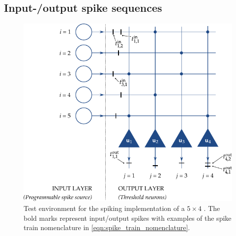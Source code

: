 \subsection{Input-/output spike sequences}
\label{sec:input_output_time_window}

\begin{figure}
	\centering
	\includegraphics{media/chp3/spinam_nomenclature.pdf}
	\caption[Spiking BiNAM implementation and spike train nomenclature]{Test environment for the spiking implementation of a $5 \times 4$ \BiNAM. The bold marks represent input/output spikes with examples of the spike train nomenclature in \cref{eqn:spike_train_nomenclature}.}
	\label{fig:spinam_nomenclature}
\end{figure}


